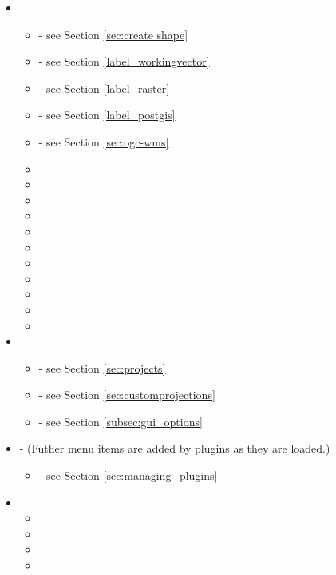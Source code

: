 \begin{itemize}
\item {}
\begin{itemize}
\item {}          	- see Section \ref{sec:create shape}
\item {}       - see Section \ref{label_workingvector}
\item {}       - see Section \ref{label_raster}
\item {}      - see Section \ref{label_postgis}
\item {}          - see Section \ref{sec:ogc-wms}
\item {}
\item {}
\item {}
\item {}
\item {}
\item {}
\item {}
\item {}
\item {}
\item {}
\item {}
\end{itemize}

\item {}
\begin{itemize}
\item {}  - see Section \ref{sec:projects}
\item {}   - see Section \ref{sec:customprojections}
\item {}             - see Section \ref{subsec:gui_options}
\end{itemize}

\item {} - (Futher menu items are added by plugins as they are loaded.)
\begin{itemize}
\item {}          	   - see Section \ref{sec:managing_plugins}
\end{itemize}          	

\item {}
\begin{itemize}
\item {}
\item {}
\item {}
\item {}
\end{itemize}

\end{itemize}

